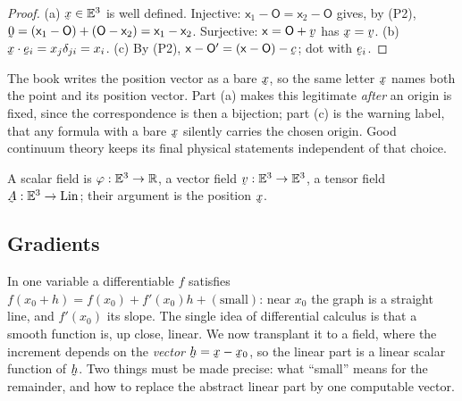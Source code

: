 \begin{proof}
(a) $\bx\in\Et$ is well defined. Injective: $\mathsf{x}_1-\mathsf{O}
=\mathsf{x}_2-\mathsf{O}$ gives, by (P2),
$\bze=(\mathsf{x}_1-\mathsf{O})+(\mathsf{O}-\mathsf{x}_2)
=\mathsf{x}_1-\mathsf{x}_2$. Surjective: $\mathsf{x}=\mathsf{O}+\bv$ has
$\bx=\bv$. (b) $\ip\bx{\be_i}=x_j\dd_{ji}=x_i$. (c) By (P2),
$\mathsf{x}-\mathsf{O}'=(\mathsf{x}-\mathsf{O})-\bc$; dot with $\be_i$.
\end{proof}

\begin{remark}[the deliberate abuse $\bx(=\bx-\bo)$]\label{rem:abuse}
The book writes the position vector as a bare $\bx$, so the same letter
$\bx$ names both the point and its position vector. Part (a) makes this
legitimate \emph{after} an origin is fixed, since the correspondence is
then a bijection; part (c) is the warning label, that any formula with a
bare $\bx$ silently carries the chosen origin. Good continuum theory keeps
its final physical statements independent of that choice.
\end{remark}

\begin{definition}[Fields]\label{def:field}
A scalar field is $\varphi:\mathbb{E}^{3}\to\mathbb{R}$, a vector field $\bv:\Et\to\Et$, a
tensor field $\bA:\Et\to\Lin$; their argument is the position $\bx$.
\end{definition}

\subsection{Gradients}\label{ss:grad}

In one variable a differentiable $f$ satisfies
$f(x_0+h)=f(x_0)+f'(x_0)h+(\text{small})$: near $x_0$ the graph is a
straight line, and $f'(x_0)$ its slope. The single idea of differential
calculus is that a smooth function is, up close, linear. We now transplant
it to a field, where the increment depends on the \emph{vector}
$\bh=\bx-\bx_0$, so the linear part is a linear scalar function of $\bh$.
Two things must be made precise: what ``small'' means for the remainder,
and how to replace the abstract linear part by one computable vector.

